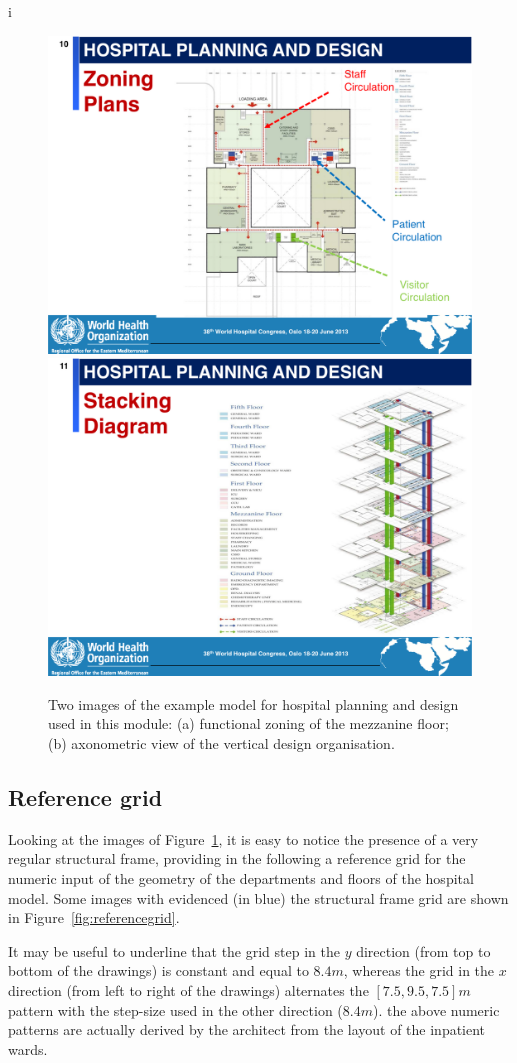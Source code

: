i\documentclass[11pt,oneside]{article}    %
\begin{document}
\begin{figure}[htbp] %
   \centering
   \includegraphics[width=0.495\linewidth]{images/hismail-1} 
   \includegraphics[width=0.495\linewidth]{images/hismail-2} 
   \caption{Two images of the example model for hospital planning and design used in this module: (a) functional zoning of the mezzanine floor; (b) axonometric view of the vertical design organisation.}
   \label{fig:hismail}
\end{figure}

\subsection{Reference grid}
\label{sec:grid}

Looking at the images of Figure~\ref{fig:hismail}, it is easy to notice the presence of a very regular structural frame, providing in the following a reference grid for the numeric input of the geometry of the departments and floors of the hospital model. Some images with evidenced (in blue) the structural frame grid are shown in Figure~\ref{fig:referencegrid}.

It may be useful to underline that the grid step in the $y$ direction (from top to bottom of the drawings) is constant and equal to $8.4 m$, whereas the grid in the $x$ direction (from left to right of the drawings) alternates the $[7.5,9.5,7.5] m$ pattern with the step-size used in the other direction ($8.4 m$).  the above numeric patterns are actually derived by the architect from the layout of the inpatient wards.
\end{document}
